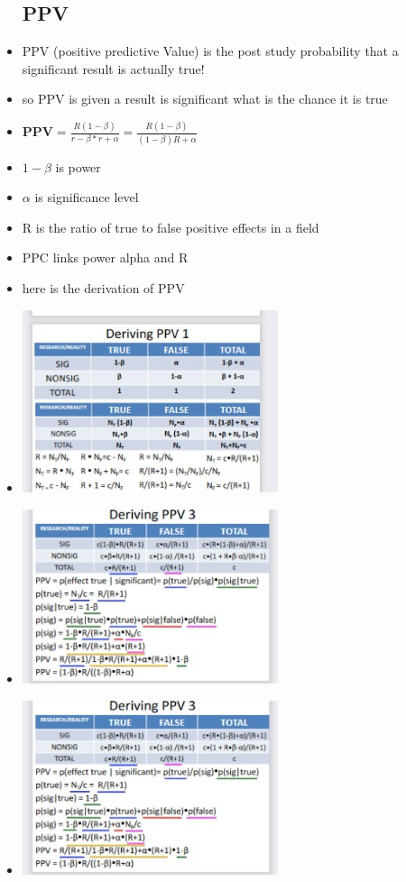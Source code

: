 \documentclass{article}
\begin{document}
\begin{itemize}
\subsection{PPV}
\item PPV (positive predictive Value) is the post study probability that a significant result is actually true!
\item so PPV is given a result is significant what is the chance it is true 
\item $\textbf{PPV}=\frac{R(1-\beta)}{r-\beta *r +\alpha}=\frac{R(1-\beta)}{(1-\beta)R+\alpha}$
\item $1-\beta$ is power 
\item $\alpha$ is significance level
\item R is the ratio of true to false positive effects in a field 
\item PPC links power alpha and R 
\item here is the derivation of PPV
\item \includegraphics[width=7.5cm]{Final_Review/lecture_6/ppv derivation 1.jpg}
\item \includegraphics[width=7.5cm]{Final_Review/lecture_6/ppv devation 3.jpg}
\item \includegraphics[width=7.5cm]{Final_Review/lecture_6/ppv devation 3.jpg}

\end{itemize}
\end{document}
